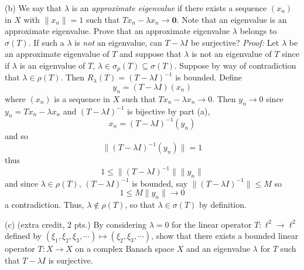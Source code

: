 \documentclass{article}
\begin{document}
\begin{itemize}
    
    (b) We say that $\lambda$ is an \textit{approximate eigenvalue} if there exists a sequence $(x_n)$ in $X$ with $\|x_n\| = 1$ such that $Tx_n - \lambda x_n \to \mathbf{0}$. Note that an eigenvalue is an approximate eigenvalue. Prove that an approximate eigenvalue $\lambda$ belongs to $\sigma(T)$. If such a $\lambda$ is \textit{not} an eigenvalue, can $T - \lambda I$ be surjective?
    \newline\newline
    \textit{Proof:} Let $\lambda$ be an approximate eigenvalue of $T$ and suppose that $\lambda$ is not an eigenvalue of $T$ since if $\lambda$ is an eigenvalue of $T$, $\lambda \in \sigma_p(T) \subseteq \sigma(T)$. Suppose by way of contradiction that $\lambda \in \rho(T)$. Then $R_{\lambda}(T) = (T - \lambda I)^{-1}$ is bounded. Define 
    \[y_n = (T - \lambda I) (x_n)\]
    where $(x_n)$ is a sequence in $X$ such that $Tx_n - \lambda x_n \to 0$. Then $y_n \to 0$ since $y_n = Tx_n - \lambda x_n$ and $(T - \lambda I)^{-1}$ is bijective by part (a),
    \[x_n = (T - \lambda I)^{-1}(y_n)\]
    and so
    \[\|(T - \lambda I)^{-1}(y_n)\| = 1\]
    thus
    \[1 \leq \|(T - \lambda I)^{-1}\|\|y_n\|\]
    and since $\lambda \in \rho(T)$, $(T - \lambda I)^{-1}$ is bounded, say $\|(T - \lambda I)^{-1}\| \leq M$ so
    \[1 \leq M\|y_n\| \to 0\]
    a contradiction. Thus, $\lambda \notin \rho(T)$, so that $\lambda \in \sigma(T)$ by definition.
    \newline\newline

    (c) (extra credit, 2 pts.) By considering $\lambda = 0$ for the linear operator $T: \ell^2 \to \ell^2$ defined by $(\xi_1, \xi_2, \xi_3, \cdots) \mapsto (\xi_2,\xi_3,\cdots)$, show that there exists a bounded linear operator $T: X \to X$ on a complex Banach space $X$ and an eigenvalue $\lambda$ for $T$ such that $T - \lambda I$ is surjective.
    \newline\newline


\end{itemize}
\end{document}
